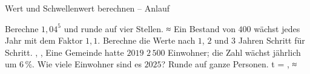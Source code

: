 \setcounter{aufgabe}{0}

\begin{aufgabe}{Wert und Schwellenwert berechnen – Anlauf}
\begin{teile}
\teil Berechne $1{,}04^5$ und runde auf vier Stellen. ≈ \leerfeld
\teil Ein Bestand von $400$ wächst jedes Jahr mit dem Faktor $1{,}1$. Berechne die Werte nach $1$, $2$ und $3$ Jahren Schritt für Schritt. \leerfeld , \leerfeld , \leerfeld
\teil Eine Gemeinde hatte $2019$ $2\,500$ Einwohner; die Zahl wächst jährlich um $6\,\%$. Wie viele Einwohner sind es $2025$? Runde auf ganze Personen. t = \leerfeld , ≈ \leerfeld
\end{teile}
\end{aufgabe}

